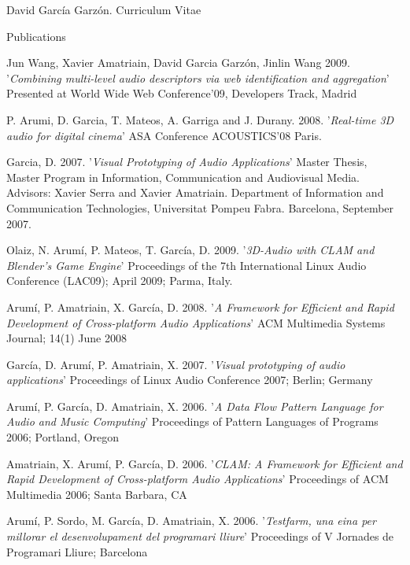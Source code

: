 \documentclass{article}
\begin{document}
\begin{cv}{David García Garzón. Curriculum Vitae}
\begin{cvlist}{Publications}
\item[] {\sc Jun Wang, Xavier Amatriain, David Garcia Garzón, Jinlin Wang} 2009.
'{\em Combining multi-level audio descriptors via web identification and aggregation}'
Presented at World Wide Web Conference'09, Developers Track, Madrid

\item[] {\sc P. Arumi, D. Garcia, T. Mateos, A. Garriga and J. Durany.} 2008.
'{\em Real-time 3D audio for digital cinema}'
ASA Conference ACOUSTICS'08 Paris.

\item[] {\sc Garcia, D.} 2007.
'{\em Visual Prototyping of Audio Applications}'
Master Thesis, Master Program in Information, Communication and Audiovisual Media. Advisors: Xavier Serra and Xavier Amatriain. Department of Information and Communication Technologies, Universitat Pompeu Fabra. Barcelona, September 2007.

\item[] {\sc Olaiz, N. Arumí, P. Mateos, T. García, D.} 2009.
'{\em 3D-Audio with CLAM and Blender's Game Engine}'
Proceedings of the 7th International Linux Audio Conference (LAC09); April 2009; Parma, Italy.

\item[] {\sc Arumí, P. Amatriain, X. García, D.} 2008.
'{\em A Framework for Efficient and Rapid Development of Cross-platform Audio Applications}'
ACM Multimedia Systems Journal; 14(1) June 2008

\item[] {\sc García, D. Arumí, P. Amatriain, X.} 2007.
'{\em Visual prototyping of audio applications}'
Proceedings of Linux Audio Conference 2007; Berlin; Germany

\item[] {\sc Arumí, P. García, D. Amatriain, X.} 2006.
'{\em A Data Flow Pattern Language for Audio and Music Computing}'
Proceedings of Pattern Languages of Programs 2006; Portland, Oregon

\item[] {\sc Amatriain, X. Arumí, P. García, D.} 2006.
'{\em CLAM: A Framework for Efficient and Rapid Development of Cross-platform Audio Applications}'
Proceedings of ACM Multimedia 2006; Santa Barbara, CA

\item[] {\sc Arumí, P. Sordo, M. García, D. Amatriain, X.} 2006.
'{\em Testfarm, una eina per millorar el desenvolupament del programari lliure}'
Proceedings of V Jornades de Programari Lliure; Barcelona


\end{cvlist}
\end{cv}
\end{document}
